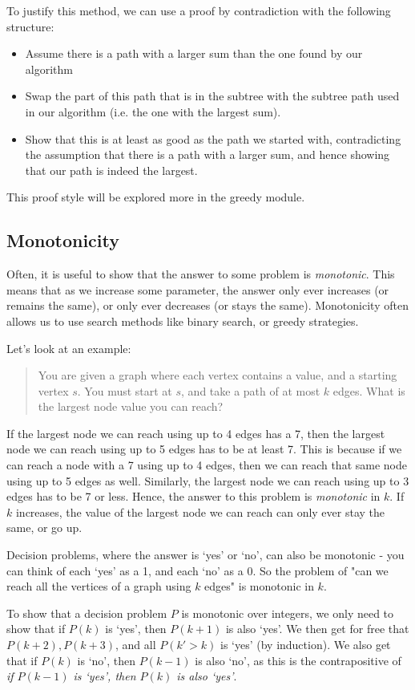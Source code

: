 \documentclass[12pt]{article}
\begin{document}
\begin{question}
To justify this method, we can use a proof by contradiction with the following structure:
\begin{itemize}
    \item Assume there is a path with a larger sum than the one found by our algorithm
    \item Swap the part of this path that is in the subtree with the subtree path used in our algorithm (i.e. the one with the largest sum).
    \item Show that this is at least as good as the path we started with, contradicting the assumption that there is a path with a larger sum, and hence showing that our  path is indeed the largest.
\end{itemize}

This proof style will be explored more in the greedy module.

\subsection*{Monotonicity}
Often, it is useful to show that the answer to some problem is \textit{monotonic}. This means that as we increase some parameter, the answer only ever increases (or remains the same), or only ever decreases (or stays the same). Monotonicity often allows us to use search methods like binary search, or greedy strategies.

Let's look at an example:
\begin{quote}
    You are given a graph where each vertex contains a value, and a starting vertex $s$. You must start at $s$, and take a path of at most $k$ edges. What is the largest node value you can reach? 
\end{quote}

If the largest node we can reach using up to 4 edges has a 7, then the largest node we can reach using up to 5 edges has to be at least 7. This is because if we can reach a node with a 7 using up to 4 edges, then we can reach that same node using up to 5 edges as well. Similarly, the largest node we can reach using up to 3 edges has to be 7 or less. Hence, the answer to this problem is \textit{monotonic} in $k$. If $k$ increases, the value of the largest node we can reach can only ever stay the same, or go up.

Decision problems, where the answer is `yes' or `no', can also be monotonic - you can think of each `yes' as a 1, and each `no' as a 0. So the problem of "can we reach all the vertices of a graph using $k$ edges" is monotonic in $k$.

To show that a decision problem $P$ is monotonic over integers, we only need to show that if $P(k)$ is `yes', then $P(k+1)$ is also `yes'. We then get for free that $P(k+2), P(k+3)$, and all $P(k' > k)$ is `yes' (by induction). We also get that if $P(k)$ is `no', then $P(k-1)$ is also `no', as this is the contrapositive of \textit{if $P(k-1)$ is `yes', then  $P(k)$ is also `yes'}.
\end{question}
\end{document}
